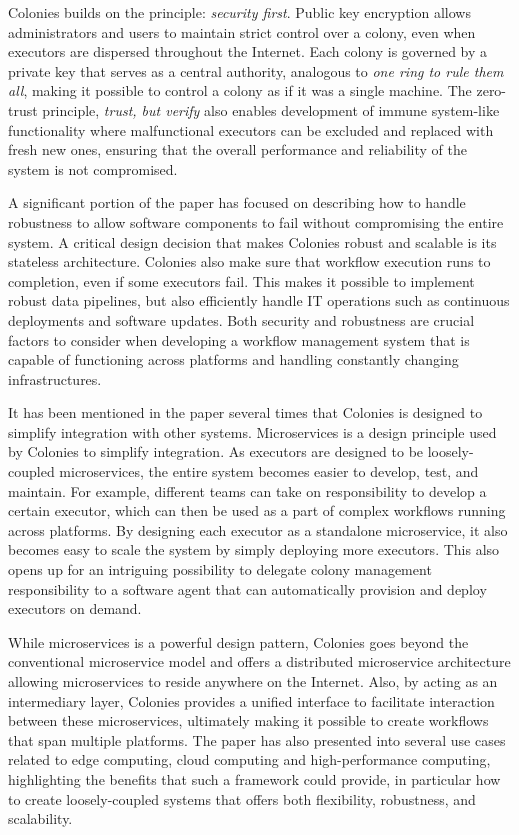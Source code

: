 \documentclass{article}
\begin{document}
Colonies builds on the principle: \emph{security first}. Public key encryption allows administrators and users to maintain strict control over a colony, even when executors are dispersed throughout the Internet. Each colony is governed by a private key that serves as a central authority, analogous to \emph{one ring to rule them all}, making it possible to control a colony as if it was a single machine. The zero-trust principle, \emph{trust, but verify} also enables development of immune system-like functionality where malfunctional executors can be excluded and replaced with fresh new ones, ensuring that the overall performance and reliability of the system is not compromised. 

A significant portion of the paper has focused on describing how to handle robustness to allow software components to fail without compromising the entire system. A critical design decision that makes Colonies robust and scalable is its stateless architecture. Colonies also make sure that workflow execution runs to completion, even if some executors fail. This makes it possible to implement robust data pipelines, but also efficiently handle IT operations such as continuous deployments and software updates. Both security and robustness are crucial factors to consider when developing a workflow management system that is capable of functioning across platforms and handling constantly changing infrastructures. 

It has been mentioned in the paper several times that Colonies is designed to simplify integration with other systems. Microservices is a design principle used by Colonies to simplify integration. As executors are designed to be loosely-coupled microservices, the entire system becomes easier to develop, test, and maintain. For example, different teams can take on responsibility to develop a certain executor, which can then be used as a part of complex workflows running across platforms. By designing each executor as a standalone microservice, it also becomes easy to scale the system by simply deploying more executors. This also opens up for an intriguing possibility to delegate colony management responsibility to a software agent that can automatically provision and deploy executors on demand.

While microservices is a powerful design pattern, Colonies goes beyond the conventional microservice model and offers a distributed microservice architecture allowing microservices to reside anywhere on the Internet. Also, by acting as an intermediary layer, Colonies provides a unified interface to facilitate interaction between these microservices, ultimately making it possible to create workflows that span multiple platforms. The paper has also presented into several use cases related to edge computing, cloud computing and high-performance computing, highlighting the benefits that such a framework could provide, in particular how to create loosely-coupled systems that offers both flexibility, robustness, and scalability.
\end{document}
